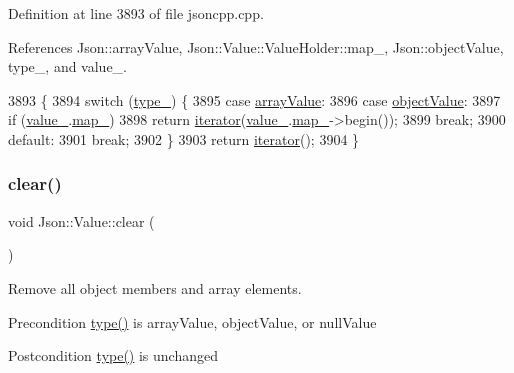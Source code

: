 Definition at line 3893 of file jsoncpp.\+cpp.



References Json\+::array\+Value, Json\+::\+Value\+::\+Value\+Holder\+::map\+\_\+, Json\+::object\+Value, type\+\_\+, and value\+\_\+.


\begin{DoxyCode}
3893                            \{
3894   \textcolor{keywordflow}{switch} (\hyperlink{class_json_1_1_value_abd222c2536dc88bf330dedcd076d2356}{type\_}) \{
3895   \textcolor{keywordflow}{case} \hyperlink{namespace_json_a7d654b75c16a57007925868e38212b4eadc8f264f36b55b063c78126b335415f4}{arrayValue}:
3896   \textcolor{keywordflow}{case} \hyperlink{namespace_json_a7d654b75c16a57007925868e38212b4eae8386dcfc36d1ae897745f7b4f77a1f6}{objectValue}:
3897     \textcolor{keywordflow}{if} (\hyperlink{class_json_1_1_value_aef578244546212705b9f81eb84d7e151}{value\_}.\hyperlink{union_json_1_1_value_1_1_value_holder_a1e7a5b86d4f52234f55c847ad1ce389a}{map\_})
3898       \textcolor{keywordflow}{return} \hyperlink{class_json_1_1_value_a341cdf2e01f8b3c5b7317aa2f0768c53}{iterator}(\hyperlink{class_json_1_1_value_aef578244546212705b9f81eb84d7e151}{value\_}.\hyperlink{union_json_1_1_value_1_1_value_holder_a1e7a5b86d4f52234f55c847ad1ce389a}{map\_}->begin());
3899     \textcolor{keywordflow}{break};
3900   \textcolor{keywordflow}{default}:
3901     \textcolor{keywordflow}{break};
3902   \}
3903   \textcolor{keywordflow}{return} \hyperlink{class_json_1_1_value_a341cdf2e01f8b3c5b7317aa2f0768c53}{iterator}();
3904 \}
\end{DoxyCode}
\mbox{\label{class_json_1_1_value_a501a4d67e6c875255c2ecc03ccd2019b}} 
\subsubsection{\texorpdfstring{clear()}{clear()}}
{\footnotesize\ttfamily void Json\+::\+Value\+::clear (\begin{DoxyParamCaption}{ }\end{DoxyParamCaption})}

Remove all object members and array elements. \begin{DoxyPrecond}{Precondition}
\hyperlink{class_json_1_1_value_a8ce61157a011894f0252ceed232312de}{type()} is array\+Value, object\+Value, or null\+Value 
\end{DoxyPrecond}
\begin{DoxyPostcond}{Postcondition}
\hyperlink{class_json_1_1_value_a8ce61157a011894f0252ceed232312de}{type()} is unchanged 
\end{DoxyPostcond}


